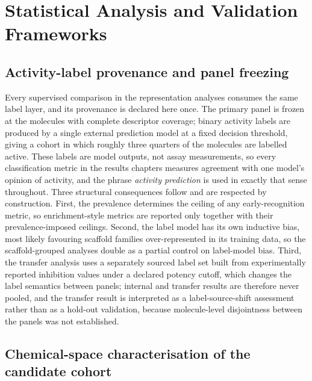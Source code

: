 \section{Statistical Analysis and Validation Frameworks}\label{sec:stats_methods}

\subsection{Activity-label provenance and panel freezing}

Every supervised comparison in the representation analyses consumes the same label layer, and its provenance is declared here once. The primary panel is frozen at the molecules with complete descriptor coverage; binary activity labels are produced by a single external prediction model at a fixed decision threshold, giving a cohort in which roughly three quarters of the molecules are labelled active. These labels are model outputs, not assay measurements, so every classification metric in the results chapters measures agreement with one model's opinion of activity, and the phrase \emph{activity prediction} is used in exactly that sense throughout. Three structural consequences follow and are respected by construction. First, the prevalence determines the ceiling of any early-recognition metric, so enrichment-style metrics are reported only together with their prevalence-imposed ceilings. Second, the label model has its own inductive bias, most likely favouring scaffold families over-represented in its training data, so the scaffold-grouped analyses double as a partial control on label-model bias. Third, the transfer analysis uses a separately sourced label set built from experimentally reported inhibition values under a declared potency cutoff, which changes the label semantics between panels; internal and transfer results are therefore never pooled, and the transfer result is interpreted as a label-source-shift assessment rather than as a hold-out validation, because molecule-level disjointness between the panels was not established.

\subsection{Chemical-space characterisation of the candidate cohort}


